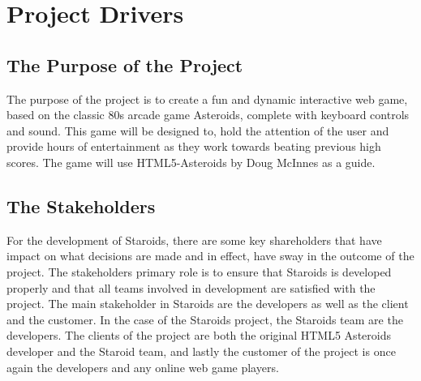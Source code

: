 \documentclass[12pt, titlepage]{article}
\begin{document}




\section{Project Drivers}

\subsection{The Purpose of the Project}
The purpose of the project is to create a fun and dynamic interactive web game, based on the classic 80s arcade game Asteroids, complete with keyboard controls and sound. This game will be designed to, hold the attention of the user and provide hours of entertainment as they work towards beating previous high scores. The game will use HTML5-Asteroids by Doug McInnes as a guide.\\

\subsection{The Stakeholders}
For the development of Staroids, there are some key shareholders that have impact on what decisions are made and in effect, have sway in the outcome of the project. The stakeholders primary role is to ensure that Staroids is developed properly and that all teams involved in development are satisfied with the project. The main stakeholder in Staroids are the developers as well as the client and the customer. In the case of the Staroids project, the Staroids team are the developers. The clients of the project are both the original HTML5 Asteroids developer and the Staroid team, and lastly the customer of the project is once again the developers and any online web game players.\\
\end{document}
